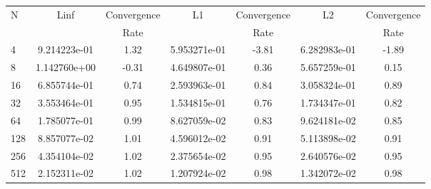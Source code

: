 \documentclass[12pt]{article}
\begin{document}
	\begin{tabular}{l|c|c|c|c|c|c}
		N&Linf&Convergence&L1&Convergence&L2&Convergence\\
		&&Rate&&Rate&&Rate\\
		\hline
		4&9.214223e-01&1.32&5.953271e-01&-3.81&6.282983e-01&-1.89\\
		\hline
		8&1.142760e+00&-0.31&4.649807e-01&0.36&5.657259e-01&0.15\\
		\hline
		16&6.855744e-01&0.74&2.593963e-01&0.84&3.058324e-01&0.89\\
		\hline
		32&3.553464e-01&0.95&1.534815e-01&0.76&1.734347e-01&0.82\\
		\hline
		64&1.785077e-01&0.99&8.627059e-02&0.83&9.624181e-02&0.85\\
		\hline
		128&8.857077e-02&1.01&4.596012e-02&0.91&5.113898e-02&0.91\\
		\hline
		256&4.354104e-02&1.02&2.375654e-02&0.95&2.640576e-02&0.95\\
		\hline
		512&2.152311e-02&1.02&1.207924e-02&0.98&1.342072e-02&0.98\\
	\end{tabular}
\end{document}
